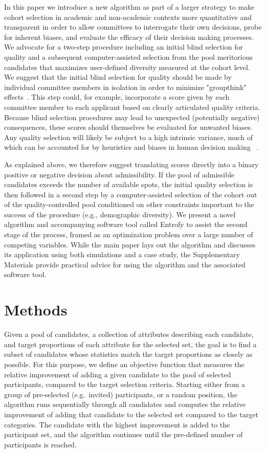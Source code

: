 \documentclass[10pt,letterpaper]{article}
\begin{document}
In this paper we introduce a new algorithm as part of a larger strategy to make cohort selection in academic and non-academic contexts more quantitative and transparent in order to allow committees to interrogate their own decisions, probe for inherent biases, and evaluate the efficacy of their decision making processes.   
We advocate for a two-step procedure including an initial blind selection for quality and a subsequent computer-assisted selection from the pool meritorious candidates that maximizes user-defined diversity measured at the cohort level. We suggest that the initial blind selection for quality should be made by individual committee members in isolation in order to minimize "groupthink" effects~\cite{janis1982}.
This step could, for example, incorporate a score given by each committee member to each applicant based on clearly articulated quality criteria.
Because blind selection procedures may lead to unexpected (potentially negative) consequences, these scores should themselves be evaluated for unwanted biases.
Any quality selection will likely be subject to a high intrinsic variance, much of which can be accounted for by heuristics and biases in human decision making ~\cite{Greenwald1995, grove1996}.

As explained above, we therefore suggest translating scores directly into a binary positive or negative decision about admissibility.
If the pool of admissible candidates exceeds the number of available spots, the initial quality selection is then followed in a second step by a computer-assisted selection of the cohort out of the quality-controlled pool conditioned on other constraints important to the success of the procedure (e.g., demographic diversity). We present a novel algorithm and accompanying software tool called Entrofy to assist the second stage of the process, framed as an optimization problem over a large number of competing variables. While the main paper lays out the algorithm and discusses its application using both simulations and a case study, the Supplementary Materials provide practical advice for using the algorithm and the associated software tool.

\section*{Methods}
\label{sec:algorithm}

Given a pool of candidates, a collection of attributes describing each candidate, and target proportions of each attribute for the selected set, the goal is to find a subset of candidates whose statistics match the target proportions as closely as possible. 
For this purpose, we define an objective function that measures the relative improvement of adding a given candidate to the pool of selected participants, compared to the target selection criteria. Starting either from a group of pre-selected (e.g.\ invited) participants, or a random position, the algorithm runs sequentially through all candidates and computes the relative improvement of adding that candidate to the selected set compared to the target categories. The candidate with the highest improvement is added to the participant set, and the algorithm continues until the pre-defined number of participants is reached.
\end{document}
